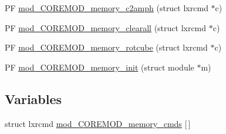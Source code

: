 \begin{DoxyCompactItemize}
\item 
P\+F \hyperlink{COREMOD__memory-util_8c_ab9d70c426dda1c8fa072c7969ddb161d}{mod\+\_\+\+C\+O\+R\+E\+M\+O\+D\+\_\+memory\+\_\+c2amph} (struct lxrcmd $\ast$c)
\item 
P\+F \hyperlink{COREMOD__memory-util_8c_a7bcce1b7da3734bf52c1c12b74d2b746}{mod\+\_\+\+C\+O\+R\+E\+M\+O\+D\+\_\+memory\+\_\+clearall} (struct lxrcmd $\ast$c)
\item 
P\+F \hyperlink{COREMOD__memory-util_8c_a6c1e41bcef306b883c1f93eb1334d24c}{mod\+\_\+\+C\+O\+R\+E\+M\+O\+D\+\_\+memory\+\_\+rotcube} (struct lxrcmd $\ast$c)
\item 
P\+F \hyperlink{COREMOD__memory-util_8c_aa5bc0cd7000dafd06d808ebcf832b0e8}{mod\+\_\+\+C\+O\+R\+E\+M\+O\+D\+\_\+memory\+\_\+init} (struct module $\ast$m)
\end{DoxyCompactItemize}
\subsection*{Variables}
\begin{DoxyCompactItemize}
\item 
struct lxrcmd \hyperlink{COREMOD__memory-util_8c_a049011604b9403caffa7a6fa0538ce27}{mod\+\_\+\+C\+O\+R\+E\+M\+O\+D\+\_\+memory\+\_\+cmds} \mbox{[}$\,$\mbox{]}
\end{DoxyCompactItemize}


